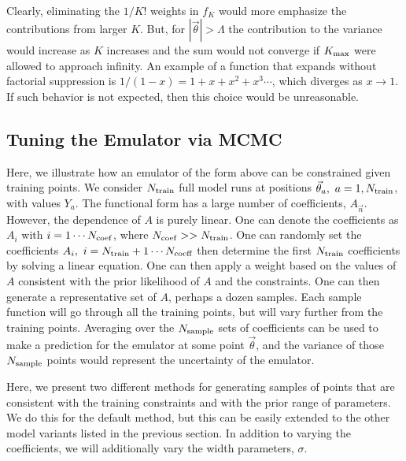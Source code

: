 \documentclass[UserManual.tex]{subfiles}
\begin{document}
\\
Clearly, eliminating the $1/K!$ weights in $f_K$ would more emphasize the contributions from larger $K$. But, for $|\vec{\theta}|>\Lambda$ the contribution to the variance would increase as $K$ increases and the sum would not converge if $K_{\rm max}$ were allowed to approach infinity. An example of a function that expands without factorial suppression is $1/(1-x)=1+x+x^2+x^3\cdots$, which diverges as $x\rightarrow 1$. If such behavior is not expected, then this choice would be unreasonable.

\subsection{Tuning the Emulator via MCMC}

Here, we illustrate how an emulator of the form above can be constrained given training points. We consider $N_{\rm train}$ full model runs at positions $\vec{\theta}_a,~a=1,N_{\rm train}$, with values $Y_a$. The functional form has a large number of coefficients, $A_{\vec{n}}$. However, the dependence of $A$ is purely linear. One can denote the coefficients as $A_i$ with $i=1\cdots N_{\rm coef}$, where $N_{\rm coef}>>N_{\rm train}$. One can randomly set the coefficients $A_i,~i=N_{\rm train}+1\cdots N_{\rm coeff}$  then determine the first $N_{\rm train}$ coefficients by solving a linear equation. One can then apply a weight based on the values of $A$ consistent with the prior likelihood of $A$ and the constraints. One can then generate a representative set of $A$, perhaps a dozen samples. Each sample function will go through all the training points, but will vary further from the training points. Averaging over the $N_{\rm sample}$ sets of coefficients can be used to make a prediction for the emulator at some point $\vec{\theta}$, and the variance of those $N_{\rm sample}$ points would represent the uncertainty of the emulator.

Here, we present two different methods for generating samples of points that are consistent with the training constraints and with the prior range of parameters. We do this for the default method, but this can be easily extended to the other model variants listed in the previous section. In addition to varying the coefficients, we will additionally vary the width parameters, $\sigma$.
\end{document}
